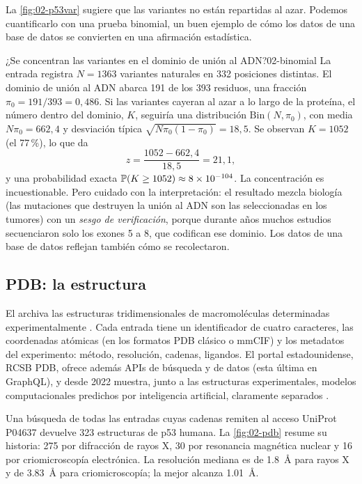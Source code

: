 La \cref{fig:02-p53var} sugiere que las variantes no están repartidas al azar. Podemos cuantificarlo con una prueba binomial, un buen ejemplo de cómo los datos de una base de datos se convierten en una afirmación estadística.

\begin{ejemplo}{¿Se concentran las variantes en el dominio de unión al ADN?}{02-binomial}
La entrada registra $N=1363$ variantes naturales en 332 posiciones distintas. El dominio de unión al ADN abarca 191 de los 393 residuos, una fracción $\pi_0=191/393=0{,}486$. Si las variantes cayeran al azar a lo largo de la proteína, el número dentro del dominio, $K$, seguiría una distribución $\mathrm{Bin}(N,\pi_0)$, con media $N\pi_0 = 662{,}4$ y desviación típica $\sqrt{N\pi_0(1-\pi_0)}=18{,}5$. Se observan $K=1052$ (el 77\,\%), lo que da
\[
z = \frac{1052 - 662{,}4}{18{,}5} = 21{,}1,
\]
y una probabilidad exacta $\mathbb{P}(K\ge 1052)\approx 8\times10^{-104}$. La concentración es incuestionable. Pero cuidado con la interpretación: el resultado mezcla biología (las mutaciones que destruyen la unión al ADN son las seleccionadas en los tumores) con un \emph{sesgo de verificación}, porque durante años muchos estudios secuenciaron solo los exones 5 a 8, que codifican ese dominio. Los datos de una base de datos reflejan también cómo se recolectaron.
\end{ejemplo}

\subsection{PDB: la estructura}

El  archiva las estructuras tridimensionales de macromoléculas determinadas experimentalmente \parencite{c02-berman2000}. Cada entrada tiene un identificador de cuatro caracteres, las coordenadas atómicas (en los formatos PDB clásico o mmCIF) y los metadatos del experimento: método, resolución, cadenas, ligandos. El portal estadounidense, RCSB PDB, ofrece además APIs de búsqueda y de datos (esta última en GraphQL), y desde 2022 muestra, junto a las estructuras experimentales, modelos computacionales predichos por inteligencia artificial, claramente separados \parencite{c02-burley2025}.

Una búsqueda de todas las entradas cuyas cadenas remiten al acceso UniProt P04637 devuelve 323 estructuras de p53 humana. La \cref{fig:02-pdb} resume su historia: 275 por difracción de rayos X, 30 por resonancia magnética nuclear y 16 por criomicroscopía electrónica. La resolución mediana es de \SI{1,8}{\angstrom} para rayos X y de \SI{3,83}{\angstrom} para criomicroscopía; la mejor alcanza \SI{1,01}{\angstrom}.

